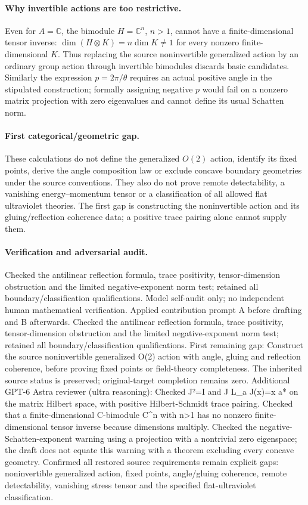 \documentclass[11pt]{article}
\begin{document}
\paragraph{Why invertible actions are too restrictive.} Even for \(A=\mathbb C\), the bimodule \(H=\mathbb C^n\), \(n>1\), cannot have a finite-dimensional tensor inverse: \(\dim(H\otimes K)=n\dim K\ne1\) for every nonzero finite-dimensional \(K\). Thus replacing the source noninvertible generalized action by an ordinary group action through invertible bimodules discards basic candidates. Similarly the expression \(p=2\pi/\theta\) requires an actual positive angle in the stipulated construction; formally assigning negative \(p\) would fail on a nonzero matrix projection with zero eigenvalues and cannot define its usual Schatten norm.
\paragraph{First categorical/geometric gap.} These calculations do not define the generalized \(O(2)\) action, identify its fixed points, derive the angle composition law or exclude concave boundary geometries under the source conventions. They also do not prove remote detectability, a vanishing energy--momentum tensor or a classification of all allowed flat ultraviolet theories. The first gap is constructing the noninvertible action and its gluing/reflection coherence data; a positive trace pairing alone cannot supply them.

\paragraph{Verification and adversarial audit.}
Checked the antilinear reflection formula, trace positivity, tensor-dimension obstruction and the limited negative-exponent norm test; retained all boundary/classification qualifications. Model self-audit only; no independent human mathematical verification. Applied contribution prompt A before drafting and B afterwards. Checked the antilinear reflection formula, trace positivity, tensor-dimension obstruction and the limited negative-exponent norm test; retained all boundary/classification qualifications. First remaining gap: Construct the source noninvertible generalized O(2) action with angle, gluing and reflection coherence, before proving fixed points or field-theory completeness. The inherited source status is preserved; original-target completion remains zero. Additional GPT-6 Astra reviewer (ultra reasoning): Checked J²=I and J L\_a J(x)=x a* on the matrix Hilbert space, with positive Hilbert-Schmidt trace pairing. Checked that a finite-dimensional C-bimodule C\textasciicircum{}n with n>1 has no nonzero finite-dimensional tensor inverse because dimensions multiply. Checked the negative-Schatten-exponent warning using a projection with a nontrivial zero eigenspace; the draft does not equate this warning with a theorem excluding every concave geometry. Confirmed all restored source requirements remain explicit gaps: noninvertible generalized action, fixed points, angle/gluing coherence, remote detectability, vanishing stress tensor and the specified flat-ultraviolet classification.
\end{document}
